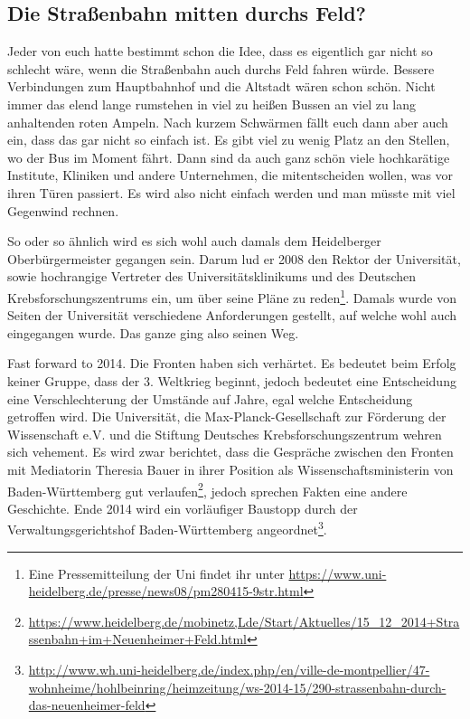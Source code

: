 \subsection{Die Straßenbahn mitten durchs Feld?}

Jeder von euch hatte bestimmt schon die Idee, dass es eigentlich gar nicht so schlecht wäre, wenn die Straßenbahn auch durchs Feld fahren würde. Bessere Verbindungen zum Hauptbahnhof und die Altstadt wären schon schön. Nicht immer das elend lange rumstehen in viel zu heißen Bussen an viel zu lang anhaltenden roten Ampeln. Nach kurzem Schwärmen fällt euch dann aber auch ein, dass das gar nicht so einfach ist. Es gibt viel zu wenig Platz an den Stellen, wo der Bus im Moment fährt. Dann sind da auch ganz schön viele hochkarätige Institute, Kliniken und andere Unternehmen, die mitentscheiden wollen, was vor ihren Türen passiert. Es wird also nicht einfach werden und man müsste mit viel Gegenwind rechnen.

So oder so ähnlich wird es sich wohl auch damals dem Heidelberger Oberbürgermeister gegangen sein. Darum lud er 2008 den Rektor der Universität, sowie hochrangige Vertreter des Universitätsklinikums und des Deutschen Krebsforschungszentrums ein, um über seine Pläne zu reden\footnote{Eine Pressemitteilung der Uni findet ihr unter \url{https://www.uni-heidelberg.de/presse/news08/pm280415-9str.html}}. Damals wurde von Seiten der Universität verschiedene Anforderungen gestellt, auf welche wohl auch eingegangen wurde. Das ganze ging also seinen Weg.

Fast forward to 2014. Die Fronten haben sich verhärtet. Es bedeutet beim Erfolg keiner Gruppe, dass der 3. Weltkrieg beginnt, jedoch bedeutet eine Entscheidung eine Verschlechterung der Umstände auf Jahre, egal welche Entscheidung getroffen wird. Die Universität, die Max-Planck-Gesellschaft zur Förderung der Wissenschaft e.V. und die Stiftung Deutsches Krebsforschungszentrum wehren sich vehement. Es wird zwar berichtet, dass die Gespräche zwischen den Fronten mit Mediatorin Theresia Bauer in ihrer Position als Wissenschaftsministerin von Baden-Württemberg gut verlaufen\footnote{\url{https://www.heidelberg.de/mobinetz,Lde/Start/Aktuelles/15_12_2014+Strassenbahn+im+Neuenheimer+Feld.html}}, jedoch sprechen Fakten eine andere Geschichte. Ende 2014 wird ein vorläufiger Baustopp durch der Verwaltungsgerichtshof Baden-Württemberg angeordnet\footnote{\url{http://www.wh.uni-heidelberg.de/index.php/en/ville-de-montpellier/47-wohnheime/hohlbeinring/heimzeitung/ws-2014-15/290-strassenbahn-durch-das-neuenheimer-feld}}.

